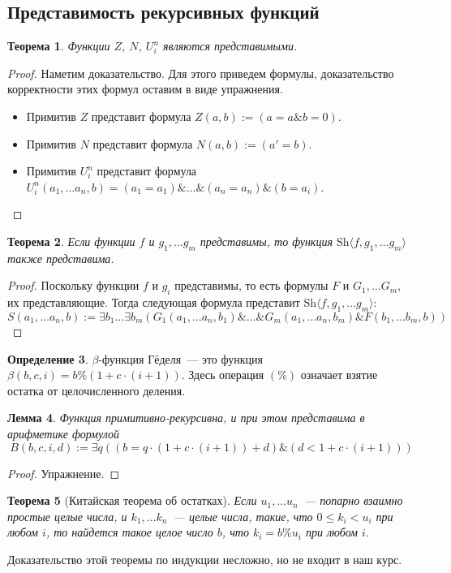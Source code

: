 \documentclass[a4paper,11pt]{article}
\newtheorem{thm}{Теорема}[section]
\newtheorem{lmm}[thm]{Лемма}
\theoremstyle{definition}
\newtheorem{dfn}[thm]{Определение}
\newcommand{\amp}{\mathbin{\&}}
\newcommand{\Sh}[1]{\mathrm{Sh}\langle #1\rangle}
\begin{document}
\subsection{Представимость рекурсивных функций}
\begin{thm}
Функции $Z$, $N$, $U^n_i$ являются представимыми.
\end{thm}
\begin{proof}
Наметим доказательство. Для этого приведем формулы, доказательство корректности
этих формул оставим в виде упражнения.
\begin{itemize}
\item Примитив $Z$ представит формула $Z(a, b) := (a = a \amp b = 0)$.
\item Примитив $N$ представит формула $N(a, b) := (a' = b)$.
\item Примитив $U^n_i$ представит формула $U^n_i(a_1, \dots a_n, b) = (a_1 = a_1)
  \amp \dots \amp (a_n = a_n) \amp (b = a_i)$.
\end{itemize}
\end{proof}

\begin{thm}
Если функции $f$ и $g_1, \dots g_m$ представимы, то функция $\Sh{f, g_1, \dots
g_m}$ также представима.
\end{thm}
\begin{proof}
Поскольку функции $f$ и $g_i$ представимы, то есть формулы $F$ и $G_1, \dots
G_m$, их представляющие. Тогда следующая формула представит $\Sh{f, g_1, \dots
g_m}$:
\[
S(a_1, \dots a_n, b) := \exists b_1 \dots \exists b_m(G_1(a_1, \dots a_n, b_1)
\amp \dots \amp G_m(a_1, \dots a_n, b_m) \amp F(b_1, \dots b_m, b))
\]
\end{proof}

\begin{dfn}
$\beta$-функция Гёделя~--- это функция $\beta(b, c, i) = b \% (1 + c \cdot (i +
1))$. Здесь операция $(\%)$ означает взятие остатка от целочисленного деления.
\end{dfn}

\begin{lmm}
Функция примитивно-рекурсивна, и при этом представима в арифметике формулой
\[ B(b, c, i, d) := \exists q((b = q \cdot (1 + c \cdot (i + 1)) + d) \amp (d < 1 + c \cdot (i + 1))) \]
\end{lmm}
\begin{proof}
Упражнение.
\end{proof}

\begin{thm}[Китайская теорема об остатках]
Если $u_1, \dots u_n$~--- попарно взаимно простые целые числа, и $k_1, \dots
k_n$~--- целые числа, такие, что $0 \le k_i < u_i$ при любом $i$, то найдется
такое целое число $b$, что $k_i = b \% u_i$ при любом $i$.
\end{thm}
Доказательство этой теоремы по индукции несложно, но не входит в наш курс.
\end{document}
